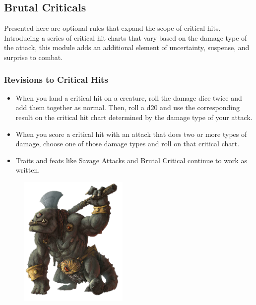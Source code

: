 \subsection*{Brutal Criticals} \label{ssec::brutalcriticals}

Presented here are optional rules that expand the scope of critical hits.
Introducing a series of critical hit charts that vary based on the damage type of the attack, this module adds an additional element of uncertainty, suspense, and surprise to combat.

\subsubsection{Revisions to Critical Hits}
    \begin{itemize}
        \item When you land a critical hit on a creature, roll the damage dice twice and add them together as normal.
        Then, roll a d20 and use the corresponding result on the critical hit chart determined by the damage type of your attack.
        \item When you score a critical hit with an attack that does two or more types of damage, choose one of those damage types and roll on that critical chart.
        \item Traits and feats like Savage Attacks and Brutal Critical continue to work as written.
    \end{itemize}

\begin{figure}[t]
    \centering
    \includegraphics[width=0.47\textwidth]{03mechanics/img/41cyclops.png}
\end{figure}

